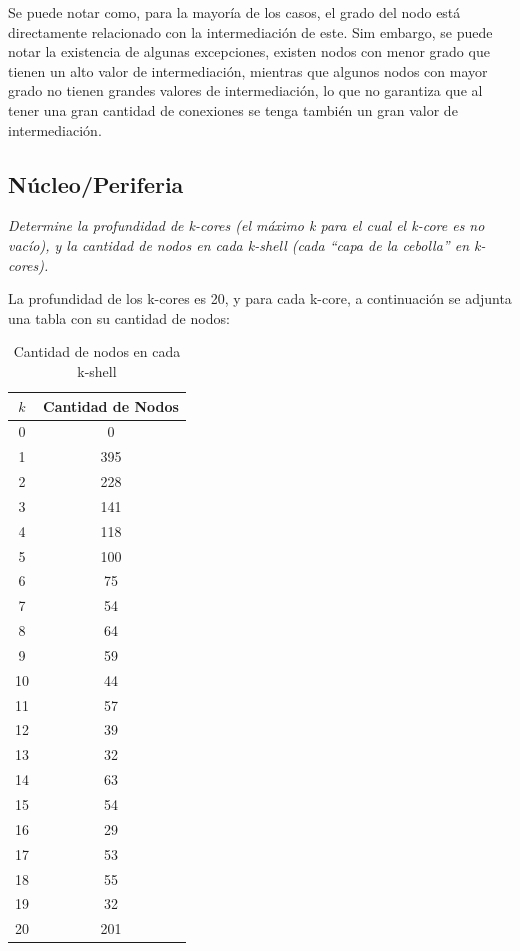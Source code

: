 \documentclass[12pt]{article}
\begin{document}
Se puede notar como, para la mayoría de los casos, el grado del nodo está directamente relacionado con la intermediación de este. Sim embargo, se puede notar la existencia de algunas excepciones, existen nodos con menor grado que tienen un alto valor de intermediación, mientras que algunos nodos con mayor grado no tienen grandes valores de intermediación, lo que no garantiza que al tener una gran cantidad de conexiones se tenga también un gran valor de intermediación.

\subsection{Núcleo/Periferia}
\textit{Determine la profundidad de k-cores (el máximo k para el cual el k-core es no vacío), y la cantidad de nodos en cada k-shell (cada “capa de la cebolla” en k-cores).}

La profundidad de los k-cores es 20, y para cada k-core, a continuación se adjunta una tabla con su cantidad de nodos:

\begin{table}[H]
    \centering
    \begin{tabular}{|c|c|}
        \hline
        \textbf{\( k \)} & \textbf{Cantidad de Nodos} \\ \hline
        0  & 0   \\ \hline
        1  & 395 \\ \hline
        2  & 228 \\ \hline
        3  & 141 \\ \hline
        4  & 118 \\ \hline
        5  & 100 \\ \hline
        6  & 75  \\ \hline
        7  & 54  \\ \hline
        8  & 64  \\ \hline
        9  & 59  \\ \hline
        10 & 44  \\ \hline
        11 & 57  \\ \hline
        12 & 39  \\ \hline
        13 & 32  \\ \hline
        14 & 63  \\ \hline
        15 & 54  \\ \hline
        16 & 29  \\ \hline
        17 & 53  \\ \hline
        18 & 55  \\ \hline
        19 & 32  \\ \hline
        20 & 201 \\ \hline
    \end{tabular}
    \caption{Cantidad de nodos en cada k-shell}
    \label{tab:k_shells}
\end{table}
\end{document}
